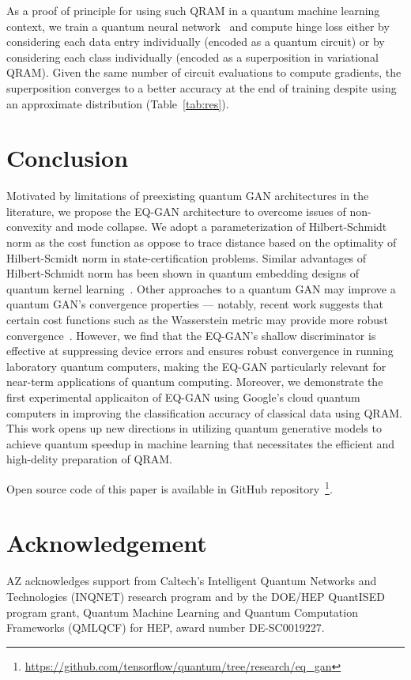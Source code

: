 \documentclass[prl,superscriptaddress,twocolumn]{revtex4}
\theoremstyle{plain}
\theoremstyle{definition}
\begin{document}
As a proof of principle for using such QRAM in a quantum machine learning context, we train a quantum neural network~\cite{farhi2018classification} and compute hinge loss either by considering each data entry individually (encoded as a quantum circuit) or by considering each class individually (encoded as a superposition in variational QRAM). Given the same number of circuit evaluations to compute gradients, the superposition converges to a better accuracy at the end of training despite using an approximate distribution (Table~\ref{tab:res}).


\section{Conclusion}
Motivated by limitations of preexisting quantum GAN architectures in the literature, we propose the EQ-GAN architecture to overcome issues of non-convexity and mode collapse. We adopt a parameterization of Hilbert-Schmidt norm as the cost function as oppose to trace distance based on the optimality of Hilbert-Scmidt norm in state-certification problems. Similar advantages of Hilbert-Schmidt norm has been shown in quantum embedding designs of quantum kernel learning~\cite{lloyd2020quantum}.  Other approaches to a quantum GAN may improve a quantum GAN's convergence properties --- notably, recent work suggests that certain cost functions such as the Wasserstein metric may provide more robust convergence~\cite{kiani2021quantum}. However, we find that the EQ-GAN's shallow discriminator is effective at suppressing device errors and ensures robust convergence in running laboratory quantum computers, making the EQ-GAN particularly relevant for near-term applications of quantum computing.  Moreover, we demonstrate the first experimental applicaiton of EQ-GAN using Google's cloud quantum computers in improving the classification accuracy of classical data using QRAM.  This work opens up new directions in utilizing quantum generative models to achieve  quantum speedup in  machine learning that necessitates the efficient and high-delity preparation of QRAM.

Open source code of this paper is available in GitHub
repository~\footnote{\url{https://github.com/tensorflow/quantum/tree/research/eq_gan}}.

\section{Acknowledgement}
AZ acknowledges support from Caltech's Intelligent Quantum Networks and Technologies (INQNET) research program and by the DOE/HEP QuantISED program grant, Quantum Machine Learning and Quantum Computation Frameworks (QMLQCF) for HEP, award number DE-SC0019227.
\end{document}
